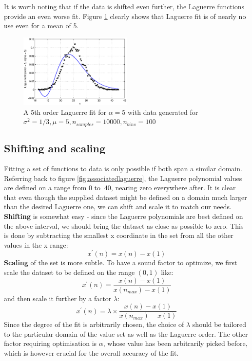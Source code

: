 \documentclass[a4paper]{article}
\numberwithin{equation}{section}
\begin{document}
\noindent It is worth noting that if the data is shifted even further, the Laguerre functions provide an even worse fit. Figure \ref{fig:poorfit} clearly shows that Laguerre fit is of nearly no use even for a mean of 5. \\

\begin{figure}[!h]
\centering
\includegraphics[width=0.5\textwidth]{poor_fit.eps}
\caption{\label{fig:poorfit}A 5th order Laguerre fit for $\alpha=5$ with data generated for $\sigma^2=1/3, \mu=5, n_{samples} = 10000, n_{bins} = 100$}
\end{figure}

\subsection{Shifting and scaling}

Fitting a set of functions to data is only possible if both span a similar domain. Referring back to figure \ref{fig:associatedlaguerre}, the Laguerre polynomial values are defined on a range from $0$ to $~40$, nearing zero everywhere after. It is clear that even though the supplied dataset might be defined on a domain much larger than the desired Laguerre one, we can shift and scale it to match our needs. \\
\textbf{Shifting} is somewhat easy - since the Laguerre polynomials are best defined on the above interval, we should bring the dataset as close as possible to zero. This is done by subtracting the smallest x coordinate in the set from all the other values in the x range:
\begin{equation}
x^\prime(n) = x(n) - x(1)
\end{equation}
\textbf{Scaling} of the set is more subtle. To have a sound factor to optimize, we first scale the dataset to be defined on the range $(0,1)$ like:
\begin{equation}
x^\prime(n) = \frac{x(n) - x(1)}{x(n_{max}) - x(1)}
\end{equation}
and then scale it further by a factor $\lambda$:
\begin{equation}
x^\prime(n) = \lambda \times \frac{x(n) - x(1)}{x(n_{max}) - x(1)}
\end{equation}
Since the degree of the fit is arbitrarily chosen, the choice of $\lambda$ should be tailored to the particular domain of the value set as well as the Laguerre order. The other factor requiring optimisation is $\alpha$, whose value has been arbitrarily picked before, which is however crucial for the overall accuracy of the fit. \\
\end{document}
